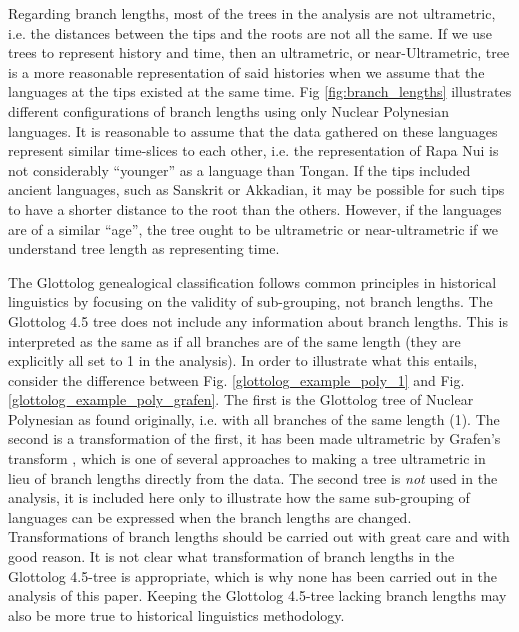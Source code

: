 \documentclass[12pt,letterpaper]{article}
\begin{document}
Regarding branch lengths, most of the trees in the analysis are not ultrametric, i.e. the distances between the tips and the roots are not all the same. If we use trees to represent history and time, then an ultrametric, or near-Ultrametric, tree is a more reasonable representation of said histories when we assume that the languages at the tips existed at the same time. Fig \ref{fig:branch_lengths} illustrates different configurations of branch lengths using only Nuclear Polynesian languages. It is reasonable to assume that the data gathered on these languages represent similar time-slices to each other, i.e. the representation of Rapa Nui is not considerably ``younger'' as a language than Tongan. If the tips included ancient languages, such as Sanskrit or Akkadian, it may be possible for such tips to have a shorter distance to the root than the others. However, if the languages are of a similar ``age'', the tree ought to be ultrametric or near-ultrametric if we understand tree length as representing time.

The Glottolog genealogical classification follows common principles in historical linguistics by focusing on the validity of sub-grouping, not branch lengths. The Glottolog 4.5 tree does not include any information about branch lengths. This is interpreted as the same as if all branches are of the same length (they are explicitly all set to 1 in the analysis). In order to illustrate what this entails, consider the difference between Fig. \ref{glottolog_example_poly_1} and Fig. \ref{glottolog_example_poly_grafen}. The first is the Glottolog tree of Nuclear Polynesian as found originally, i.e. with all branches of the same length (1). The second is a transformation of the first, it has been made ultrametric by Grafen's transform \citep{grafen1989phylogenetic}, which is one of several approaches to making a tree ultrametric in lieu of branch lengths directly from the data. The second tree is \emph{not} used in the analysis, it is included here only to illustrate how the same sub-grouping of languages can be expressed when the branch lengths are changed. Transformations of branch lengths should be carried out with great care and with good reason. It is not clear what transformation of branch lengths in the Glottolog 4.5-tree is appropriate, which is why none has been carried out in the analysis of this paper. Keeping the Glottolog 4.5-tree lacking branch lengths may also be more true to historical linguistics methodology.
\end{document}
